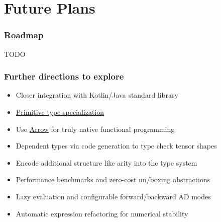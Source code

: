 \documentclass{beamer}
\begin{document}
    \section{Future Plans}\label{sec:fifth-section}

    \begin{frame}
        \frametitle{Roadmap}
        \item TODO
    \end{frame}

    \begin{frame}
        \frametitle{Further directions to explore}
        \begin{itemize}
            \item Closer integration with Kotlin/Java standard library
            \item \href{https://discuss.kotlinlang.org/t/primitive-type-specialization/11022/4}{Primitive type specialization}
            \item Use \href{https://arrow-kt.io/}{Arrow} for truly native functional programming
            \item Dependent types via code generation to type check tensor shapes
            \item Encode additional structure like arity into the type system
            \item Performance benchmarks and zero-cost un/boxing abstractions
            \item Lazy evaluation and configurable forward/backward AD modes
            \item Automatic expression refactoring for numerical stability
        \end{itemize}
    \end{frame}
\end{document}
